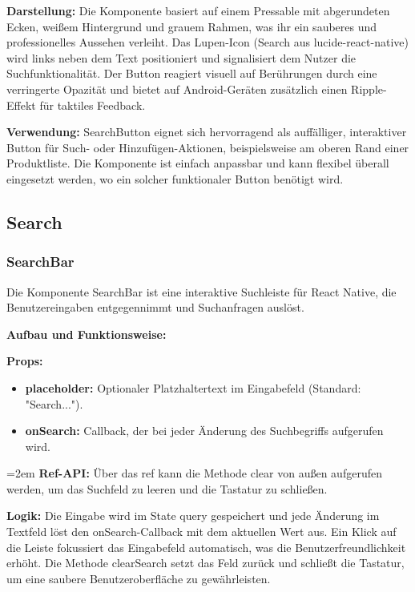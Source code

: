 \textbf{Darstellung:}
Die Komponente basiert auf einem Pressable mit abgerundeten Ecken, weißem Hintergrund und grauem Rahmen, was ihr ein sauberes und professionelles Aussehen verleiht. Das Lupen-Icon (Search aus lucide-react-native) wird links neben dem Text positioniert und signalisiert dem Nutzer die Suchfunktionalität. Der Button reagiert visuell auf Berührungen durch eine verringerte Opazität und bietet auf Android-Geräten zusätzlich einen Ripple-Effekt für taktiles Feedback.

\noindent\textbf{Verwendung:} SearchButton eignet sich hervorragend als auffälliger, interaktiver Button für Such- oder Hinzufügen-Aktionen, beispielsweise am oberen Rand einer Produktliste. Die Komponente ist einfach anpassbar und kann flexibel überall eingesetzt werden, wo ein solcher funktionaler Button benötigt wird.

\subsection{Search}

\subsubsection{SearchBar}
Die Komponente SearchBar ist eine interaktive Suchleiste für React Native, die Benutzereingaben entgegennimmt und Suchanfragen auslöst.

\noindent\textbf{Aufbau und Funktionsweise:}

\textbf{Props:}
\begin{itemize}
    \item \textbf{placeholder:} Optionaler Platzhaltertext im Eingabefeld (Standard: "Search...").
    \item \textbf{onSearch:} Callback, der bei jeder Änderung des Suchbegriffs aufgerufen wird.
\end{itemize}

\hangindent=2em
\textbf{Ref-API:}
Über das ref kann die Methode clear von außen aufgerufen werden, um das Suchfeld zu leeren und die Tastatur zu schließen.

\textbf{Logik:}
Die Eingabe wird im State query gespeichert und jede Änderung im Textfeld löst den onSearch-Callback mit dem aktuellen Wert aus. Ein Klick auf die Leiste fokussiert das Eingabefeld automatisch, was die Benutzerfreundlichkeit erhöht. Die Methode clearSearch setzt das Feld zurück und schließt die Tastatur, um eine saubere Benutzeroberfläche zu gewährleisten.

